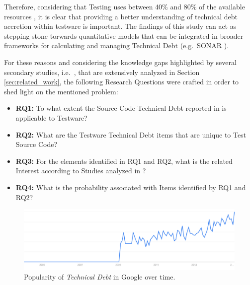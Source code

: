Therefore, considering that Testing uses between 40\% and 80\% of the available resources \cite{exploratorying_testing_td}, it is clear that providing a better understanding of technical debt accretion within testware is important. The findings of this study can act as stepping stone torwards quantitative models that can be integrated in broader frameworks for calculating and managing Technical Debt (e.g.\ SONAR \cite{sonar_evaluate_td}).

For these reasons and considering the knowledge gaps highlighted by several secondary studies, i.e.\ \cite{mapping_study_td, exploration_of_td, exploration_of_td2}, that are extensively analyzed in Section \ref{sec:related_work}, the following Research Questions were crafted in order to shed light on the mentioned problem:

\begin{itemize}
    \itemsep0em 
    
    \item \textbf{RQ1:} To what extent the Source Code Technical Debt reported in \cite{mapping_study_td} is applicable to Testware?
    
    \item \textbf{RQ2:} What are the Testware Technical Debt items that are unique to Test Source Code?
    
    \item \textbf{RQ3:} For the elements identified in RQ1 and RQ2, what is the related Interest according to Studies analyzed in \cite{mapping_study_td}?
    
    \item \textbf{RQ4:} What is the probability associated with Items identified by RQ1 and RQ2?
    
\end{itemize}


\begin{figure}[h]
    \centering
    \includegraphics[width=\textwidth]{figure/technicalDebt.pdf}
    \caption{Popularity of \textit{Technical Debt} in Google over time.}
    \label{fig:technical_debt_trend}
\end{figure}

